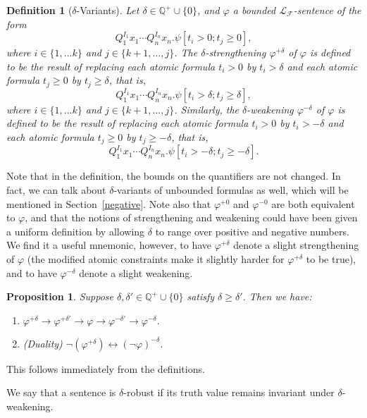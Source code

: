 \documentclass[conference]{IEEEtran}
\newtheorem{proposition}[theorem]{Proposition}
\newtheorem{definition}[theorem]{Definition}
\begin{document}
\begin{definition}[$\delta$-Variants]
Let $\delta\in \mathbb{Q}^+\cup\{0\}$, and $\varphi$ a bounded $\mathcal{L}_{\mathcal{F}}$-sentence of the form
$$Q_1^{I_1}x_1\cdots Q_n^{I_n}x_n.\psi[t_i>0; t_j\geq 0],$$
where $i\in\{1,...k\}$ and $j\in\{k+1,...,j\}$. The {\em $\delta$-strengthening} $\varphi^{+\delta}$ of $\varphi$ is defined to be the result of replacing each atomic formula $t_i > 0$ by $t_i > \delta$ and each atomic formula $t_j \geq 0$ by $t_j \geq \delta$, that is,
$$Q_1^{I_1}x_1\cdots Q_n^{I_n}x_n.\psi[t_i>\delta; t_j\geq \delta],$$
where $i\in\{1,...k\}$ and $j\in\{k+1,...,j\}$.
Similarly, the {\em $\delta$-weakening} $\varphi^{-\delta}$ of $\varphi$ is defined to be the result of replacing each atomic formula $t_i > 0$ by $t_i > -\delta$ and each atomic formula $t_j \geq 0$ by $t_j \geq -\delta$, that is,
$$Q_1^{I_1}x_1\cdots Q_n^{I_n}x_n.\psi[t_i>-\delta; t_j\geq -\delta].$$
\end{definition}

Note that in the definition, the bounds on the quantifiers are not changed. In fact, we can talk about $\delta$-variants of unbounded formulas as well, which will be mentioned in Section~\ref{negative}. Note also that $\varphi^{+0}$ and $\varphi^{-0}$ are both equivalent to $\varphi$, and that the notions of strengthening and weakening could have been given a uniform definition by allowing $\delta$ to range over positive and negative numbers. We find it a useful mnemonic, however, to have $\varphi^{+\delta}$ denote a slight strengthening of $\varphi$ (the modified atomic constraints make it slightly harder for $\varphi^{+\delta}$ to be true), and to have $\varphi^{-\delta}$ denote a slight weakening.

\begin{proposition}\label{trivial}
Suppose $\delta,\delta'\in \mathbb{Q}^+\cup\{0\}$ satisfy $\delta\geq\delta'$. Then we have: 
\begin{enumerate}
\item $\varphi^{+\delta}\rightarrow\varphi^{+\delta'} \rightarrow \varphi \rightarrow \varphi^{-\delta'}\rightarrow \varphi^{-\delta}.$
\item (Duality) $\neg(\varphi^{+\delta})\leftrightarrow (\neg\varphi)^{-\delta}$.
\end{enumerate}
\end{proposition}

This follows immediately from the definitions. 

We say that a sentence is $\delta$-robust if its truth value remains invariant under $\delta$-weakening.
\end{document}
